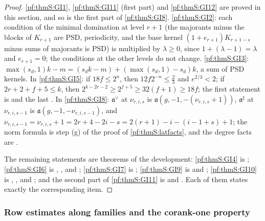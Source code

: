 \begin{proof}
\ref{pf:thmS:GI1}, \ref{pf:thmS:GI11} (first part) and \ref{pf:thmS:GI12} are proved in this section, and so is the first part of
\ref{pf:thmS:GI8}. \ref{pf:thmS:GI2}: each condition of the minimal domination at level $r+1$ (the majorants minus the blocks of
$K_{r+1}$ are PSD, periodicity, and the base kernel $(1+e_{r+1})K_{r+1-s}$ minus sums of majorants is PSD) is multiplied by
$\lambda\ge0$, since $1+(\lambda-1)=\lambda$ and $e_{r+1}=0$; the conditions at the other levels do not change.
\ref{pf:thmS:GI3}: $\max(s_d,1)k-m=(s_dk-m)+(\max(s_d,1)-s_d)k$, a sum of PSD kernels. In \ref{pf:thmS:GI5}: if $18f\le2^n$, then
$12f2^{-n}\le\frac23$ and $e^{2/3}<2$; if $2r+2+f+5\le k$, then $2^{k-2r-2}\ge2^{f+5}\ge32(f+1)\ge18f$; the first statement is
 and the last . In
\ref{pf:thmS:GI8}: $\mathfrak a^\vee$ at $\nu_{r,i,s}$ is $\mathfrak a(g,-1,-(\nu_{r,i,s}+1))$, $\mathfrak a^\sharp$ at
$\nu_{r,i,s-1}$ is $\mathfrak a(g,-1,-\nu_{r,i,s-1})$, and $\nu_{r,i,s-1}=\nu_{r,i,s}+1=2r+4-2i-s=2(r+1)-i-(i-1+s)+1$; the norm
formula is step (g) of the proof of \cref{pf:thmS:latfacts}, and the degree facts are
.

The remaining statements are theorems of the development: \ref{pf:thmS:GI4} is
; \ref{pf:thmS:GI6} is
, , and ;
\ref{pf:thmS:GI7} is ; \ref{pf:thmS:GI9} is
 and ;
\ref{pf:thmS:GI10} is
, , and ;
and the second part of \ref{pf:thmS:GI11} is
 and . Each of them
states exactly the corresponding item.
\end{proof}

\subsubsection{Row estimates along families and the corank-one property}\label{sec:pf:thmS:loopsproofs}

